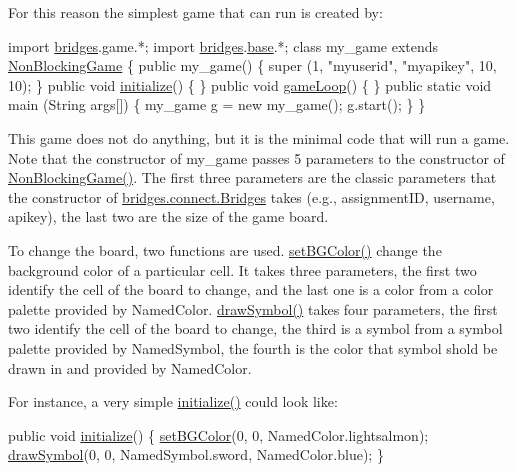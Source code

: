 For this reason the simplest game that can run is created by\+:


\begin{DoxyCode}
\textcolor{keyword}{import} \hyperlink{namespacebridges}{bridges}.game.*;
\textcolor{keyword}{import} \hyperlink{namespacebridges}{bridges}.\hyperlink{namespacebridges_1_1base}{base}.*;
\textcolor{keyword}{class }my\_game \textcolor{keyword}{extends} \hyperlink{classbridges_1_1games_1_1_non_blocking_game_ae85ea8dcc355372ba354f4e26323fb76}{NonBlockingGame} \{
  \textcolor{keyword}{public} my\_game() \{ super (1, \textcolor{stringliteral}{"myuserid"},  \textcolor{stringliteral}{"myapikey"}, 10, 10); \}
  \textcolor{keyword}{public} \textcolor{keywordtype}{void} \hyperlink{classbridges_1_1games_1_1_game_base_a973a52d5eee7c29b01d668fba3c61657}{initialize}()  \{ \}
  \textcolor{keyword}{public} \textcolor{keywordtype}{void} \hyperlink{classbridges_1_1games_1_1_game_base_a56d05ed744791cfc1c3792f39ff438f1}{gameLoop}()  \{ \}
  \textcolor{keyword}{public} \textcolor{keyword}{static} \textcolor{keywordtype}{void}  main (String args[]) \{
    my\_game g = \textcolor{keyword}{new} my\_game();
    g.start();
  \}
\}
\end{DoxyCode}


This game does not do anything, but it is the minimal code that will run a game. Note that the constructor of my\+\_\+game passes 5 parameters to the constructor of \hyperlink{classbridges_1_1games_1_1_non_blocking_game_ae85ea8dcc355372ba354f4e26323fb76}{Non\+Blocking\+Game()}. The first three parameters are the classic parameters that the constructor of \hyperlink{classbridges_1_1connect_1_1_bridges}{bridges.\+connect.\+Bridges} takes (e.\+g., assignment\+ID, username, apikey), the last two are the size of the game board.

To change the board, two functions are used. \hyperlink{classbridges_1_1games_1_1_game_base_a7b4d08cdb306a5bf7104ab5315acb414}{set\+B\+G\+Color()} change the background color of a particular cell. It takes three parameters, the first two identify the cell of the board to change, and the last one is a color from a color palette provided by Named\+Color. \hyperlink{classbridges_1_1games_1_1_game_base_a03e8446feb00d5957a7e160a4fa76342}{draw\+Symbol()} takes four parameters, the first two identify the cell of the board to change, the third is a symbol from a symbol palette provided by Named\+Symbol, the fourth is the color that symbol shold be drawn in and provided by Named\+Color.

For instance, a very simple \hyperlink{classbridges_1_1games_1_1_game_base_a973a52d5eee7c29b01d668fba3c61657}{initialize()} could look like\+: 
\begin{DoxyCode}
\textcolor{keyword}{public} \textcolor{keywordtype}{void} \hyperlink{classbridges_1_1games_1_1_game_base_a973a52d5eee7c29b01d668fba3c61657}{initialize}() \{
  \hyperlink{classbridges_1_1games_1_1_game_base_a7b4d08cdb306a5bf7104ab5315acb414}{setBGColor}(0, 0, NamedColor.lightsalmon);
  \hyperlink{classbridges_1_1games_1_1_game_base_a03e8446feb00d5957a7e160a4fa76342}{drawSymbol}(0, 0, NamedSymbol.sword, NamedColor.blue);
\}
\end{DoxyCode}


